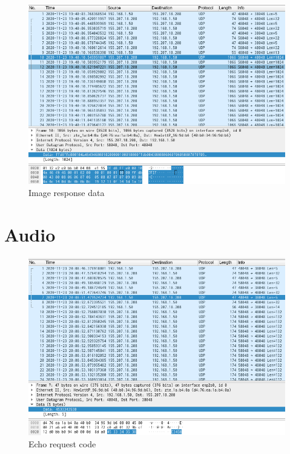 \documentclass[12pt, a4paper]{article}
\begin{document}
\pagebreak
\begin{figure}[h!]
\centering
	\includegraphics[height=.4\textheight, width=\textwidth, keepaspectratio]{assets/wireshark/image4.png}
	\caption{Image response data} 
\end{figure}


\section{Audio}

\begin{figure}[h!]
\centering
	\includegraphics[height=.4\textheight, width=\textwidth, keepaspectratio]{assets/wireshark/audio1.png}
	\caption{Echo request code} 
\end{figure}
\end{document}
